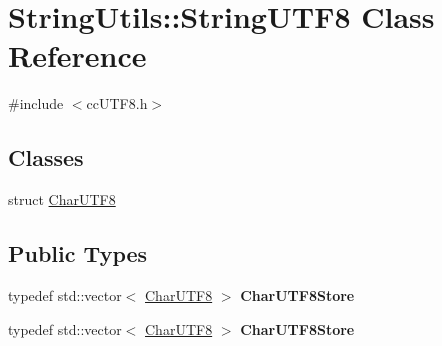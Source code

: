 \hypertarget{classStringUtils_1_1StringUTF8}{}\section{String\+Utils\+:\+:String\+U\+T\+F8 Class Reference}
\label{classStringUtils_1_1StringUTF8}


{\ttfamily \#include $<$cc\+U\+T\+F8.\+h$>$}

\subsection*{Classes}
\begin{DoxyCompactItemize}
\item 
struct \hyperlink{structStringUtils_1_1StringUTF8_1_1CharUTF8}{Char\+U\+T\+F8}
\end{DoxyCompactItemize}
\subsection*{Public Types}
\begin{DoxyCompactItemize}
\item 
\mbox{\label{classStringUtils_1_1StringUTF8_af00f84b63cdfaef858c76e39ae48a110}} 
typedef std\+::vector$<$ \hyperlink{structStringUtils_1_1StringUTF8_1_1CharUTF8}{Char\+U\+T\+F8} $>$ {\bfseries Char\+U\+T\+F8\+Store}
\item 
\mbox{\label{classStringUtils_1_1StringUTF8_af00f84b63cdfaef858c76e39ae48a110}} 
typedef std\+::vector$<$ \hyperlink{structStringUtils_1_1StringUTF8_1_1CharUTF8}{Char\+U\+T\+F8} $>$ {\bfseries Char\+U\+T\+F8\+Store}
\end{DoxyCompactItemize}

